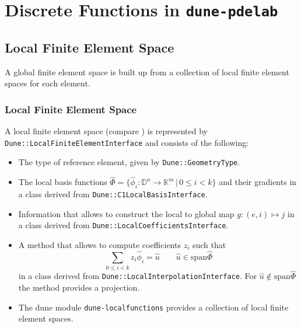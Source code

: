\section{Discrete Functions in \texttt{dune-pdelab}}

\subsection{Local Finite Element Space}

A global finite element space is built up from a collection of local
finite element spaces for each element.

\begin{frame}
\frametitle<presentation>{Local Finite Element Space}
A local finite element space (compare \cite{Ciarlet}) 
is represented by \lstinline{Dune::LocalFiniteElementInterface}
and consists of the following:
\begin{itemize}
\item The type of reference element, given by \lstinline{Dune::GeometryType}.
\item The local basis functions
$\hat\Phi = \{\hat\phi_i : \mathbb{D}^n \to \mathbb{K}^m \,|\, 0\leq i < k\}$
and their gradients in a class derived from \lstinline{Dune::C1LocalBasisInterface}.
\item Information that allows to construct the local to global map $g:
(e,i) \mapsto j$ in a class derived
from \lstinline{Dune::LocalCoefficientsInterface}. 
\item A method that allows to compute coefficients $z_i$ such that
\begin{equation*}
\sum_{0\leq i < k} z_i \hat\phi_i = \hat{u} \qquad \hat{u}\in\text{span}\hat\Phi 
\end{equation*} 
in a class derived
from \lstinline{Dune::LocalInterpolationInterface}. For
$\hat{u}\not\in\text{span}\hat\Phi$ the method provides a projection.
\item The dune module \lstinline{dune-localfunctions} provides a
collection of local finite element spaces.
\end{itemize}
\end{frame}

